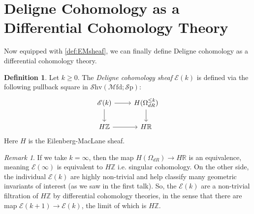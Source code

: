 \documentclass[10pt]{amsart}
\newcommand{\E}{\mathscr{E}}
\newcommand{\bR}{\mathbb{R}}
\newcommand{\bZ}{\mathbb{Z}}
\newcommand{\Sp}{\mathscr{S}\mathrm{p}}
\newcommand{\Ch}{\mathscr{C}\mathrm{h}}
\newcommand{\Mfd}{\mathscr{M}\mathrm{fd}}
\newcommand{\Shv}{\mathscr{S}\mathrm{hv}}
\newcommand{\nrnote}[1]{\todo[color=green!40,linecolor=green!40!black,size=\tiny]{#1}}
\theoremstyle{definition}
\newtheorem{definition}[equation]{Definition}
\theoremstyle{remark}
\newtheorem{remark}[equation]{Remark}
\begin{document}
\section{Deligne Cohomology as a Differential Cohomology Theory}
Now equipped with \cref{def:EMsheaf}, we can finally define Deligne cohomology as a differential cohomology theory.

\begin{definition}
  Let $k \geq 0$. The \emph{Deligne cohomology sheaf} $\E(k)$ is defined via the following pullback square in $\Shv(\Mfd; \Sp)$:
  \[
  \begin{tikzcd}
   \E(k) \arrow[r] \arrow[d] & H(\Omega_{dR}^{\leq k}) \arrow[d] \\
   H\bZ \arrow[r] & H \bR 
  \end{tikzcd}
  \]
  Here $H$ is the  Eilenberg-MacLane sheaf.
\end{definition}







\begin{remark}
  If we take $k = \infty$, then the map $H(\Omega_{dR}) \to H\bR$ is an equivalence, meaning $\E(\infty)$ is equivalent to $H\bZ$ i.e. singular cohomology. On the other side, the individual $\E(k)$ are highly non-trivial and help classify many geometric invariants of interest (as we saw in the first talk). So, the $\E(k)$ are a non-trivial filtration of $H\bZ$ by differential cohomology theories, in the sense that there are map $\E(k+1) \to \E(k)$, the limit of which is $H\bZ$.
\end{remark}

\end{document}
